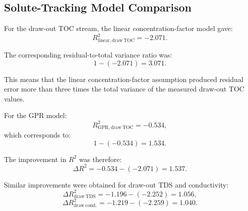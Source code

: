 \subsection{Solute-Tracking Model Comparison}
For the draw-out TOC stream, the linear concentration-factor model gave:
\begin{equation}
R^2_{\mathrm{linear, draw\ TOC}} = -2.071.
\end{equation}

The corresponding residual-to-total variance ratio was:
\begin{equation}
1-(-2.071)=3.071.
\end{equation}

This means that the linear concentration-factor assumption produced residual error more than three times the total variance of the measured draw-out TOC values.

For the GPR model:
\begin{equation}
R^2_{\mathrm{GPR, draw\ TOC}} = -0.534,
\end{equation}
which corresponds to:
\begin{equation}
1-(-0.534)=1.534.
\end{equation}

The improvement in $R^2$ was therefore:
\begin{equation}
\Delta R^2 =
-0.534 - (-2.071)
=
1.537.
\end{equation}

Similar improvements were obtained for draw-out TDS and conductivity:
\begin{equation}
\Delta R^2_{\mathrm{draw\ TDS}}
=
-1.196 - (-2.252)
=
1.056,
\end{equation}
\begin{equation}
\Delta R^2_{\mathrm{draw\ cond.}}
=
-1.219 - (-2.259)
=
1.040.
\end{equation}
